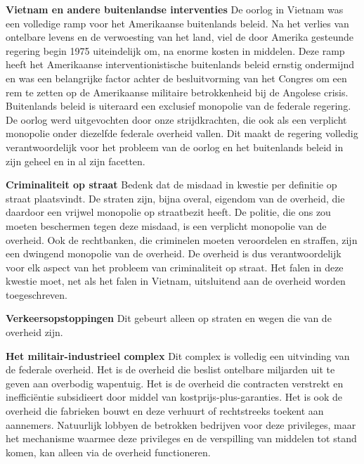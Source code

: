 \documentclass[
  a5paper,
  smalldemyvopaper,10pt,twoside,onecolumn,openright,extrafontsizes,hidelinks]{memoir}
\begin{document}
\textbf{Vietnam en andere buitenlandse interventies} De oorlog in
Vietnam was een volledige ramp voor het Amerikaanse buitenlands beleid.
Na het verlies van ontelbare levens en de verwoesting van het land, viel
de door Amerika gesteunde regering begin 1975 uiteindelijk om, na enorme
kosten in middelen. Deze ramp heeft het Amerikaanse interventionistische
buitenlands beleid ernstig ondermijnd en was een belangrijke factor
achter de besluitvorming van het Congres om een rem te zetten op de
Amerikaanse militaire betrokkenheid bij de Angolese crisis. Buitenlands
beleid is uiteraard een exclusief monopolie van de federale regering. De
oorlog werd uitgevochten door onze strijdkrachten, die ook als een
verplicht monopolie onder diezelfde federale overheid vallen. Dit maakt
de regering volledig verantwoordelijk voor het probleem van de oorlog en
het buitenlands beleid in zijn geheel en in al zijn facetten.

\textbf{Criminaliteit op straat} Bedenk dat de misdaad in kwestie per
definitie op straat plaatsvindt. De straten zijn, bijna overal, eigendom
van de overheid, die daardoor een vrijwel monopolie op straatbezit
heeft. De politie, die ons zou moeten beschermen tegen deze misdaad, is
een verplicht monopolie van de overheid. Ook de rechtbanken, die
criminelen moeten veroordelen en straffen, zijn een dwingend monopolie
van de overheid. De overheid is dus verantwoordelijk voor elk aspect van
het probleem van criminaliteit op straat. Het falen in deze kwestie
moet, net als het falen in Vietnam, uitsluitend aan de overheid worden
toegeschreven.

\textbf{Verkeersopstoppingen} Dit gebeurt alleen op straten en wegen die
van de overheid zijn.

\textbf{Het militair-industrieel complex} Dit complex is volledig een
uitvinding van de federale overheid. Het is de overheid die beslist
ontelbare miljarden uit te geven aan overbodig wapentuig. Het is de
overheid die contracten verstrekt en inefficiëntie subsidieert door
middel van kostprijs-plus-garanties. Het is ook de overheid die
fabrieken bouwt en deze verhuurt of rechtstreeks toekent aan aannemers.
Natuurlijk lobbyen de betrokken bedrijven voor deze privileges, maar het
mechanisme waarmee deze privileges en de verspilling van middelen tot
stand komen, kan alleen via de overheid functioneren.
\end{document}

